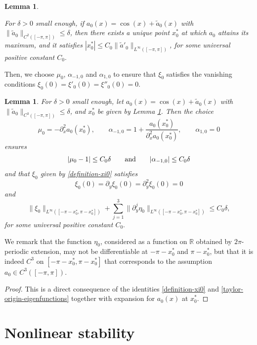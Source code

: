 \documentclass[12pt]{amsart}
\numberwithin{equation}{section}
\numberwithin{equation}{section}
\newtheorem{lem}[thm]{Lemma}
\begin{document}
\begin{lem} \label{lem:characterization-x0*}

For $\delta>0$ small enough, if $a_0(x)=\cos(x)+\tilde a_0(x)$ with $\| \tilde a_0\|_{C^2([-\pi,\pi])}\leq \delta$, then there exists a unique point $x^*_0$ at which $a_0$ attains its maximum, and it satisfies $|x^*_0|\leq C_0 \|   \tilde a'_0\|_{L^\infty([-\pi,\pi])}$,  for some universal positive constant $C_0.$

\end{lem}

Then, we choose $\mu_0$, $\alpha_{-1,0}$ and $\alpha_{1,0}$ to ensure that $\xi_0$ satisfies the vanishing conditions $\xi_0(0)= \xi'_0(0)=\xi''_0(0)=0$.

\begin{lem} \label{lem:initial-data}
For $\delta>0$ small enough, let $a_0(x)=\cos(x)+\tilde a_0(x)$ with $\| \tilde a_0\|_{C^3([-\pi,\pi])}\leq \delta$, and $x^*_0$ be given by Lemma \ref{lem:characterization-x0*}. Then the choice
$$
\mu_0=-\partial_x^2 a_0(x_0^*), \qquad \alpha_{-1,0}=1+\frac{a_0(x_0^*)}{\partial_x^2 a_0(x_0^*)}, \qquad \alpha_{1,0}=0
$$
ensures
$$
|\mu_0-1|\leq C_0 \delta \qquad {\rm and} \qquad |\alpha_{-1,0}|\leq C_0 \delta
$$
and that $\xi_0$ given by \eqref{definition-xi0} satisfies
\begin{equation} \label{taylor-origin-initial-xi}
\xi_0(0)=\partial_y \xi_0(0)=\partial_y^2 \xi_0(0)=0
\end{equation}
and
$$
\| \xi_0\|_{L^\infty([-\pi-x_0^*,\pi-x_0^*])}+\sum_{j=1}^3 \| \partial_y^j \eta_0 \|_{L^\infty([-\pi-x_0^*,\pi-x_0^*])}\leq C_0 \delta,
$$
for some universal positive constant $C_0.$
\end{lem}


We remark that the function $\eta_0$, considered as a function on $\mathbb R$ obtained by $2\pi$-periodic extension, may not be differentiable at $-\pi-x_0^*$ and $\pi-x_0^*$, but that it is indeed $C^3$ on $[-\pi-x_0^*,\pi-x_0^*]$ that corresponds to the assumption $a_0\in  C^3([-\pi, \pi])$.


\begin{proof}

This is a direct consequence of the identities \eqref{definition-xi0} and \eqref{taylor-origin-eigenfunctions} together with expansion for $a_0(x)$ at $x_0^*.$
\end{proof}

  

 \section{Nonlinear stability}\label{S5}
 
\end{document}
